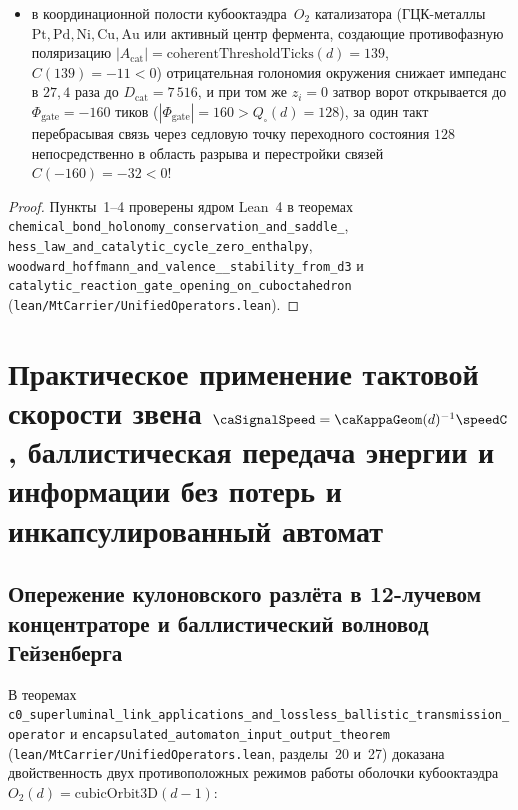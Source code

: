 \begin{theorem}[Аналитические теоремы химической кинетики, переходного состояния $|A^\ddagger|=128$, селективности Вудворда--Хоффмана и катализа на кубооктаэдре~$O_2$]
\begin{enumerate}[leftmargin=*]
\begin{itemize}[nosep,leftmargin=*]
  \item в координационной полости кубооктаэдра~$O_2$ катализатора (ГЦК-металлы $\mathrm{Pt}, \mathrm{Pd}, \mathrm{Ni}, \mathrm{Cu}, \mathrm{Au}$ или активный центр фермента, создающие противофазную поляризацию $|A_{\mathrm{cat}}| = \mathrm{coherentThresholdTicks}(d) = 139$, $C(139) = -11 < 0$) отрицательная голономия окружения снижает импеданс в $27{,}4$ раза до $D_{\mathrm{cat}} = 7\,516$, и при том же $z_i = 0$ затвор ворот открывается до $\Phi_{\mathrm{gate}} = -160$ тиков ($|\Phi_{\mathrm{gate}}| = 160 > Q_\square(d) = 128$), за один такт перебрасывая связь через седловую точку переходного состояния $128$ непосредственно в область разрыва и перестройки связей $C(-160) = -32 < 0$!
  \end{itemize}
\end{enumerate}
\end{theorem}

\begin{proof}
Пункты~1--4 проверены ядром Lean~4 в теоремах \texttt{chemical\_\allowbreak bond\_\allowbreak holonomy\_\allowbreak conservation\_\allowbreak and\_\allowbreak saddle\_}, \texttt{hess\_\allowbreak law\_\allowbreak and\_\allowbreak catalytic\_\allowbreak cycle\_\allowbreak zero\_\allowbreak enthalpy}, \texttt{woodward\_\allowbreak hoffmann\_\allowbreak and\_\allowbreak valence\_\_\allowbreak stability\_\allowbreak from\_\allowbreak d3} и \texttt{catalytic\_\allowbreak reaction\_\allowbreak gate\_\allowbreak opening\_\allowbreak on\_\allowbreak cuboctahedron} (\texttt{lean/MtCarrier/UnifiedOperators.lean}).
\end{proof}

\chapter{Практическое применение тактовой скорости звена \texorpdfstring{$\caSignalSpeed = \caKappaGeom(d)^{-1}\speedC$}{c0 = kappa\^-1 c}, баллистическая передача энергии и информации без потерь и инкапсулированный автомат}
\label{ch:applied-c0-lossless-transmission}

\section{Опережение кулоновского разлёта в 12-лучевом концентраторе и баллистический волновод Гейзенберга}
\label{sec:applied-c0-overdrive-and-waveguide}

В теоремах \texttt{c0\_superluminal\_link\_applications\_and\_lossless\_ballistic\_transmission\_operator} и \texttt{encapsulated\_automaton\_input\_output\_theorem} (\texttt{lean/MtCarrier/UnifiedOperators.lean}, разделы~20 и~27) доказана двойственность двух противоположных режимов работы оболочки кубооктаэдра $O_2(d)=\mathrm{cubicOrbit3D}(d-1)$:

